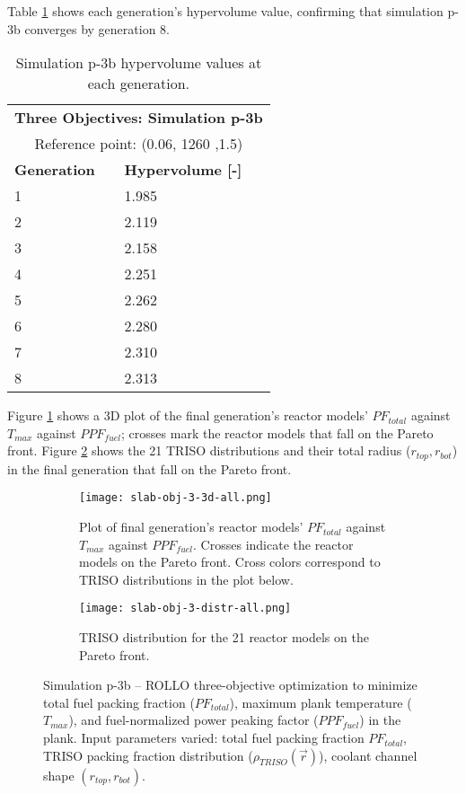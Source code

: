Table \ref{tab:p3b-hypervolume} shows each generation's hypervolume value, 
confirming that simulation p-3b converges by generation 8. 
\begin{table}[htbp!]
    \centering
    \onehalfspacing
    \caption{Simulation p-3b hypervolume values at each generation.}
	\label{tab:p3b-hypervolume}
    \footnotesize
    \begin{tabular}{ll}
    \hline 
    \multicolumn{2}{c}{\textbf{Three Objectives: Simulation p-3b}} \\
    \multicolumn{2}{c}{Reference point: (0.06, 1260 ,1.5)} \\
    \hline 
    \textbf{Generation} & \textbf{Hypervolume [-]} \\
    \hline
    1 & 1.985 \\
    2 & 2.119 \\
    3 & 2.158 \\
    4 & 2.251\\
    5 & 2.262 \\
    6 & 2.280 \\
    7 & 2.310 \\
    8 & 2.313 \\
    \hline
    \end{tabular}
\end{table}

Figure \ref{fig:slab-obj-3-3d-all} shows a 3D plot of the final generation's reactor 
models' $PF_{total}$ against $T_{max}$ against $PPF_{fuel}$; crosses mark the 
reactor models that fall on the Pareto front.
Figure \ref{fig:slab-obj-3-distr-all} shows the 21 TRISO distributions and their
total radius ($r_{top}, r_{bot}$) in the final generation that fall on the Pareto 
front. 
\begin{figure}[htbp!]
    \begin{subfigure}{\textwidth}
        \centering
        \texttt{[image: slab-obj-3-3d-all.png]}
        \caption{Plot of final generation's reactor models' $PF_{total}$ against 
        $T_{max}$ against $PPF_{fuel}$. Crosses indicate the reactor models on the 
        Pareto front. Cross colors correspond to TRISO distributions in the plot below.}
        \label{fig:slab-obj-3-3d-all} 
    \end{subfigure}
    \begin{subfigure}{\textwidth}
        \texttt{[image: slab-obj-3-distr-all.png]}
        \caption{TRISO distribution for the 21 reactor models on the Pareto front.}
        \label{fig:slab-obj-3-distr-all} 
    \end{subfigure}
    \caption{Simulation p-3b -- ROLLO three-objective optimization to minimize total 
    fuel packing fraction ($PF_{total}$), maximum plank temperature ($T_{max}$), and 
    fuel-normalized power peaking factor ($PPF_{fuel}$) in the plank. 
    Input parameters varied: total fuel packing fraction $PF_{total}$, 
    TRISO packing fraction distribution ($\rho_{TRISO}(\vec{r})$), 
    coolant channel shape $(r_{top}, r_{bot})$.}
    \label{fig:slab-obj-3-all}
\end{figure}

